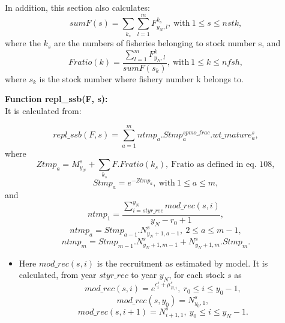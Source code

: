 \documentclass{article}
\begin{document}
In addition, this section also calculates:
\begin{equation}
    sumF(s)=\sum_{k_s}\sum_{l=1}^m F^{k_s}_{y_N,l}, \  \text{with} \ 1\leq s \leq nstk,
\end{equation}
where the $k_s$ are the numbers of fisheries belonging to stock number s, and
\begin{equation}
    Fratio(k)=\dfrac{\sum_{l=1}^mF^k_{y_N,l}}{sumF(s_k)}, \  \text{with} \ 1\leq k  \leq nfsh,
\end{equation}
where $s_k$ is the stock number where fishery number k belongs to.

\textbf{Function repl\_ssb(F, s):}\\
It is calculated from:

\begin{equation}
    repl\_ssb(F,s)=\sum_{a=1}^m ntmp_a. Stmp^{spmo\_frac}_a.wt\_mature^s_a,
\end{equation}
where
\begin{equation}
    Ztmp_a=M^s_{y_N}+\sum_{k_s}F.Fratio(k_s), \ \text{Fratio as defined in eq. 108},
\end{equation}
\begin{equation}
    Stmp_a=e^{-Ztmp_a}, \ \text{with} \ 1\leq a \leq m,
\end{equation}
and
\begin{equation}
    ntmp_1 = \dfrac{\displaystyle\sum_{i=styr\_rec}^{y_N} {mod\_rec}(s,i)}{{y_N}-r_0+1},
\end{equation}
\begin{equation}
    ntmp_a=Stmp_{a-1}.N^s_{y_N+1,{a-1}}, \ 2\leq a\leq m-1,
\end{equation}
\begin{equation}
    ntmp_{m}=Stmp_{m-1}.N^s_{y_N+1,m-1}+N^s_{y_N+1,m}.Stmp_{m}.
\end{equation}
\begin{itemize}
    \item Here $mod\_rec(s,i)$ is the recruitment as estimated by model. It is calculated, from year $styr\_rec$ to year $y_N$, for each stock $s$ as
     \begin{equation}
        mod\_rec(s,i)=e^{\epsilon^s_i+\mu^s_{R,i}}, \ r_0\leq i \leq y_0-1,
    \end{equation}
    \begin{equation}
        mod\_rec(s,y_0)=N^s_{y_0,1},
    \end{equation}
    \begin{equation}
        mod\_rec(s,i+1)=N^s_{i+1,1}, \ y_0\leq i \leq y_N-1.
    \end{equation}
   
\end{itemize}
\end{document}
